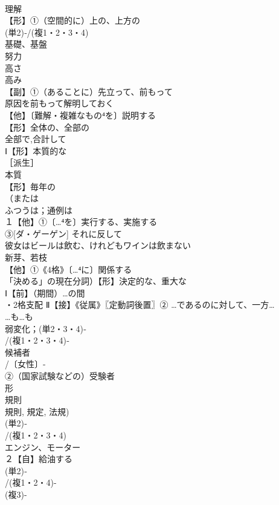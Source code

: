 \documentclass[8pt]{extreport}
\begin{document}
\begin{CJK}{UTF8}{min}
\\	理解
\\	【形】①（空間的に）上の、上方の 
\\	(単2)‐/(複1・2・3・4)
\\	基礎、基盤 
\\	努力 
\\	高さ 
\\	高み
\\	【副】①（あることに）先立って、前もって 
\\	原因を前もって解明しておく
\\	【他】〔難解・複雑なもの⁴を〕説明する 
\\	【形】全体の、全部の 
\\	全部で,合計して
\\	Ⅰ【形】本質的な 
\\	［派生］ 
\\	本質
\\	【形】毎年の 
\\	（または
\\	ふつうは；通例は
\\	１【他】①〔…⁴を〕実行する、実施する 
\\	③[ダ・ゲーゲン] それに反して 
\\	彼女はビールは飲む、けれどもワインは飲まない
\\	新芽、若枝 
\\	【他】①《4格》〔…⁴に〕関係する 
\\	「決める」の現在分詞）【形】決定的な、重大な
\\	Ⅰ【前】（期間）…の間 
\\	・2格支配 Ⅱ【接】《従属》〖定動詞後置〗② …であるのに対して、一方…
\\	…も…も
\\	弱変化；(単2・3・4)‐
\\	/(複1・2・3・4)‐
\\	候補者 
\\	/〔女性〕-
\\	②（国家試験などの）受験者
\\	形 
\\	規則 
\\	規則, 規定, 法規)
\\	(単2)‐
\\	/(複1・2・3・4)
\\	エンジン、モーター
\\	２【自】給油する
\\	(単2)‐
\\	/(複1・2・4)-
\\	(複3)-

\end{CJK}
\end{document}
